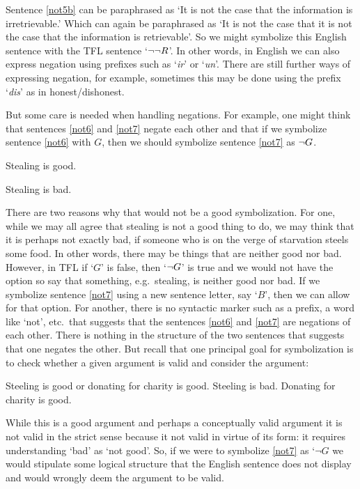 Sentence \ref{not5b} can be paraphrased as `It is not the case that the information is irretrievable.' Which can again be paraphrased as `It is not the case that it is not the case that the information is retrievable'. So we might symbolize this English sentence with the TFL sentence `$\neg\neg R$'. In other words, in English we can also express negation using prefixes such as `\emph{ir}' or `\emph{un}'. There are still further ways of expressing negation, for example, sometimes this may be done using  the prefix `\emph{dis}' as in honest/dishonest.

But some care is needed when handling negations. For example, one might think that sentences \ref{not6} and \ref{not7} negate each other and that if we symbolize sentence \ref{not6} with $G$, then we should symbolize sentence  \ref{not7} as $\neg G$.

\begin{earg}
		\item[\ex{not6}] Stealing is good.
		\item[\ex{not7}] Stealing is bad.
		\end{earg}

There are two reasons why that would not be a good symbolization. For one, while we may all agree that stealing is not a good thing to do, we may think that it is perhaps not exactly bad, if someone who is on the verge of starvation steels some food. In other words, there may be things that are neither good nor bad. However,  in TFL if `$G$' is false, then `$\neg G$' is true and we would not have the option so say that something, e.g.~stealing, is neither good nor bad. If we symbolize sentence \ref{not7} using a new sentence letter, say `$B$', then we can allow for that option. For another, there is no syntactic marker such as a prefix, a word like `not', etc.~that suggests that the sentences \ref{not6} and \ref{not7} are negations of each other. There is nothing in the structure of the two sentences that suggests that one negates the other.  But recall that one principal goal for symbolization is to check whether a given argument is valid and consider the argument:
\begin{earg}
\prem Steeling is good or donating for charity is good.
\prem Steeling is bad.
\conc Donating for charity is good.
\end{earg}
While this is a good argument and perhaps a conceptually valid argument it is not valid in the strict sense because it not valid in virtue of its form: it requires understanding `bad' as `not good'. So, if we were to symbolize \ref{not7} as `$\neg G$ we would stipulate some logical structure that the English sentence does not display and would wrongly deem the argument to be valid.

